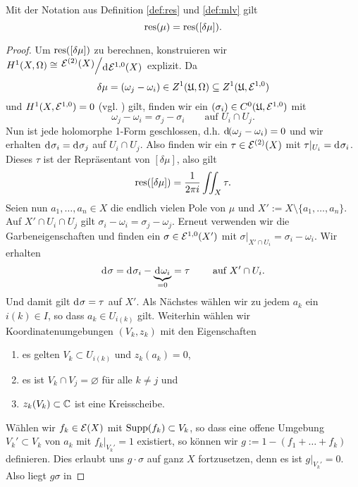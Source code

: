 \begin{thm}
  \label{thm:res}
  Mit der Notation aus Definition \ref{def:res} und \ref{def:mlv} gilt
  \[
  \operatorname{res}(\mu) = \operatorname{res}([\delta \mu]).
  \]
\end{thm}

\begin{proof}
  Um $\operatorname{res}([\delta \mu])$ zu berechnen, konstruieren wir $H^1(X,
  \Omega) \cong \quot{\diff^{(2)}(X)}{\d[\diff^{1,0}(X)]}$
  explizit. Da
  \[
  \delta \mu = (\omega_j - \omega_i) \in Z^1(\mathfrak{U},
  \Omega) \subseteq Z^1(\mathfrak{U}, \mathcal{E}^{1,0})
  \]
  und $H^1(X, \mathcal{E}^{1,0}) =
  0$ (vgl. \cite[Satz 12.6]{For}) gilt, finden wir ein
  $(\sigma_i) \in C^0(\mathfrak{U}, \mathcal{E}^{1,0})$ mit
  \[
  \omega_j - \omega_i = \sigma_j - \sigma_i \qquad \text{auf } U_i
  \cap U_j.
  \]
  Nun ist jede holomorphe 1-Form geschlossen, d.h. $\d[(\omega_j -
  \omega_i)] = 0$ und wir erhalten \break$\d[\sigma_i] = \d[\sigma_j]$ auf
  $U_i \cap U_j$. Also finden wir ein $ \tau \in \mathcal{E}^{(2)}(X)$ mit
  $\tau|_{U_i} = \d[\sigma_i]$. Dieses $\tau$ ist der Repräsentant
  von $[\delta \mu]$, also gilt
  \[
  \operatorname{res}([\delta \mu]) = \frac{1}{2\pi i} \iint_X \tau.
  \]
  Seien nun $a_1, \dots, a_n \in X$ die endlich vielen Pole von $\mu$
  und $X' := X \setminus \{a_1, \dots, a_n\}$. Auf $X' \cap U_i \cap
  U_j$ gilt $\sigma_i - \omega_i = \sigma_j - \omega_j$. Erneut
  verwenden wir die Garbeneigenschaften und finden ein $\sigma \in
  \mathcal{E}^{1,0}(X')$ mit $\sigma|_{X' \cap U_i} = \sigma_i -
  \omega_i$. Wir erhalten
  \[
  \d[\sigma] = \d[\sigma_i] - \underbrace{\d[\omega_i]}_{= 0} = \tau
  \qquad \text{ auf } X' \cap U_i.
  \]
  Und damit gilt $\d[\sigma] = \tau$ auf $X'$. Als Nächstes
  wählen wir zu jedem $a_k$ ein $i(k) \in I$, so dass $a_k \in
  U_{i(k)}$ gilt. Weiterhin wählen wir Koordinatenumgebungen $(V_k,
  z_k)$ mit den Eigenschaften
  \begin{enumerate}
  \item es gelten $V_k \subset U_{i(k)}$ und $z_k(a_k) = 0$,
  \item es ist $V_k \cap V_j = \varnothing$ für alle $k \neq j$ und
  \item $z_k(V_k) \subset \mathbb{C}$ ist eine Kreisscheibe.
  \end{enumerate}
  Wählen wir $f_k \in \mathcal{E}(X)$ mit $\operatorname{Supp}(f_k) \subset V_k$, so
  dass eine offene Umgebung $V_k' \subset V_k$ von $a_k$ mit
  $f_k|_{V_k'} = 1$ existiert, so können wir $g:= 1 - (f_1 + \dots + f_k)$
  definieren. Dies erlaubt uns $g \cdot \sigma$ auf ganz $X$
  fortzusetzen, denn es ist $g|_{V_k'} = 0$. Also liegt $g \sigma$ in

\end{proof}
